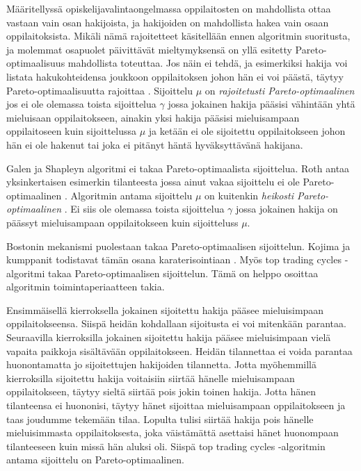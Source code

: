 \documentclass[gradu, twoside]{tktltiki}
\begin{document}
Määritellyssä opiskelijavalintaongelmassa oppilaitosten on mahdollista
ottaa vastaan vain osan hakijoista, ja hakijoiden on mahdollista hakea
vain osaan oppilaitoksista. Mikäli nämä rajoitetteet käsitellään ennen
algoritmin suoritusta, ja molemmat osapuolet päivittävät
mieltymyksensä on yllä esitetty Pareto-optimaalisuus mahdollista
toteuttaa. Jos näin ei tehdä, ja esimerkiksi hakija voi listata
hakukohteidensa joukkoon oppilaitoksen johon hän ei voi päästä, täytyy
Pareto-optimaalisuutta rajoittaa \cite{kojima10}. Sijoittelu $\mu$ on
\emph{rajoitetusti Pareto-optimaalinen} jos ei ole olemassa toista
sijoittelua $\gamma$ jossa jokainen hakija pääsisi vähintään yhtä
mieluisaan oppilaitokseen, ainakin yksi hakija pääsisi mieluisampaan
oppilaitoseen kuin sijoittelussa $\mu$ ja ketään ei ole sijoitettu
oppilaitokseen johon hän ei ole hakenut tai joka ei pitänyt häntä
hyväksyttävänä hakijana.

Galen ja Shapleyn algoritmi ei takaa Pareto-optimaalista sijoittelua.
Roth antaa yksinkertaisen esimerkin tilanteesta jossa ainut vakaa
sijoittelu ei ole Pareto-optimaalinen \cite{roth82}. Algoritmin antama
sijoittelu $\mu$ on kuitenkin \emph{heikosti Pareto-optimaalinen}
\cite{gusfield89}. Ei siis ole olemassa toista sijoittelua $\gamma$
jossa jokainen hakija on päässyt mieluisampaan oppilaitokseen kuin
sijoitteluss $\mu$.

Bostonin mekanismi puolestaan takaa Pareto-optimaalisen sijoittelun.
Kojima ja kumppanit todistavat tämän osana karaterisointiaan
\cite{kojima10}. Myös top trading cycles -algoritmi takaa
Pareto-optimaalisen sijoittelun. Tämä on helppo osoittaa algoritmin
toimintaperiaatteen takia.

Ensimmäisellä kierroksella jokainen sijoitettu hakija pääsee
mieluisimpaan oppilaitokseensa. Siispä heidän kohdallaan sijoitusta ei
voi mitenkään parantaa. Seuraavilla kierroksilla jokainen sijoitettu
hakija pääsee mieluisimpaan vielä vapaita paikkoja sisältävään
oppilaitokseen. Heidän tilannettaa ei voida parantaa huonontamatta jo
sijoitettujen hakijoiden tilannetta. Jotta myöhemmillä kierroksilla
sijoitettu hakija voitaisiin siirtää hänelle mieluisampaan
oppilaitokseen, täytyy sieltä siirtää pois jokin toinen hakija. Jotta
hänen tilanteensa ei huononisi, täytyy hänet sijoittaa mieluisampaan
oppilaitokseen ja taas joudumme tekemään tilaa. Lopulta tulisi siirtää
hakija pois hänelle mieluisimmasta oppilaitoksesta, joka väistämättä
asettaisi hänet huonompaan tilanteeseen kuin missä hän aluksi oli.
Siispä top trading cycles -algoritmin antama sijoittelu on
Pareto-optimaalinen.
\end{document}
